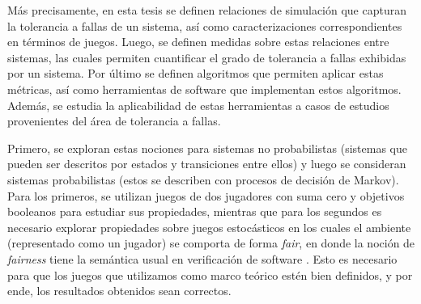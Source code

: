 
Más precisamente, en esta tesis se definen relaciones de simulación que capturan la tolerancia a fallas de un sistema, así como caracterizaciones correspondientes en términos de juegos. Luego, se definen medidas sobre estas relaciones entre sistemas, las cuales permiten cuantificar el grado de tolerancia a fallas exhibidas por un sistema. Por último se definen algoritmos que permiten aplicar estas métricas, así como herramientas de software que implementan estos algoritmos. Además, se estudia la aplicabilidad de estas herramientas a casos de estudios provenientes del área de tolerancia a fallas.

Primero, se exploran estas nociones para sistemas no probabilistas (sistemas que pueden ser descritos por estados y transiciones entre ellos) y luego se consideran sistemas probabilistas (estos se describen con procesos de decisión de Markov). Para los primeros, se utilizan juegos de dos jugadores con suma cero y objetivos booleanos para estudiar sus propiedades, mientras que para los segundos es necesario explorar propiedades sobre juegos estocásticos en los cuales el ambiente (representado como un jugador) se comporta de forma \textit{fair}, en donde la noción de \textit{fairness} tiene la semántica usual en verificación de software \cite{BaierK08}.  Esto es necesario para que los juegos que utilizamos como marco teórico estén bien definidos, y por ende, los resultados obtenidos sean correctos.

